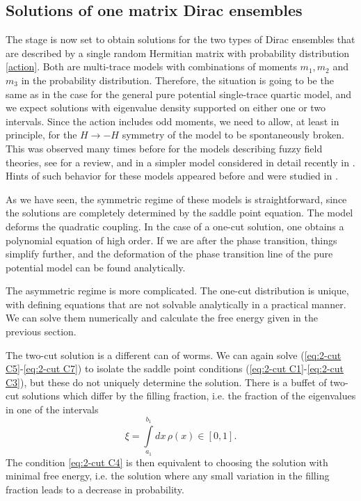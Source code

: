 \documentclass[10pt]{article}
\theoremstyle{plain}
\theoremstyle{definition}
\theoremstyle{plain}
\begin{document}
\subsection{Solutions of one matrix Dirac ensembles}

The stage is now set to obtain solutions for the two types of Dirac ensembles that are described by a single random Hermitian matrix with probability distribution \eqref{action}. Both are multi-trace models with combinations of moments $m_1,m_2$ and $m_3$ in the probability distribution. Therefore, the situation is going to be the same as in the case for the general pure potential single-trace quartic model, and we expect solutions with eigenvalue density supported on either one or two intervals. Since the action includes odd moments, we need to allow, at least in principle, for the ${H\to - H}$ symmetry of the model to be spontaneously broken. This was observed many times before for the models describing fuzzy field theories, see \cite{Tekel:2023tdx} for a review, and in a simpler model considered in detail recently in \cite{Bukor:2024kqy}. Hints of such behavior for these models appeared before \cite{d2022numerical} and were studied in \cite{d2026symmetry}.

As we have seen, the symmetric regime of these models is straightforward, since the solutions are completely determined by the saddle point equation. The model deforms the quadratic coupling. In the case of a one-cut solution, one obtains a polynomial equation of high order. If we are after the phase transition, things simplify further, and the deformation of the phase transition line of the pure potential model can be found analytically.

The asymmetric regime is more complicated. The one-cut distribution is unique, with defining equations that are not solvable analytically in a practical manner. We can solve them numerically and calculate the free energy given in the previous section.

The two-cut solution is a different can of worms. We can again solve (\ref{eq:2-cut C5}-\ref{eq:2-cut C7}) to isolate the saddle point conditions (\ref{eq:2-cut C1}-\ref{eq:2-cut C3}), but these do not uniquely determine the solution. There is a buffet of two-cut solutions which differ by the filling fraction, i.e. the fraction of the eigenvalues in one of the intervals
\begin{equation}
 \xi=\int\limits_{a_1}^{b_1} dx\,\rho(x)\in[0,1].
\end{equation}
The condition \eqref{eq:2-cut C4} is then equivalent to choosing the solution with minimal free energy, i.e. the solution where any small variation in the filling fraction leads to a decrease in probability.
\end{document}
